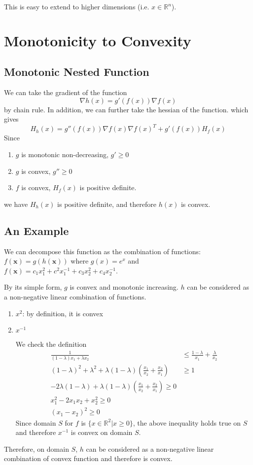 This is easy to extend to higher dimensions (i.e. $x \in \mathbb{R}^n$).

\section{Monotonicity to Convexity}

\subsection{Monotonic Nested Function}

We can take the gradient of the function
\[
\nabla h(x) = g'(f(x))\nabla f(x)
\]
by chain rule.
In addition, we can further take the hessian of the function. which gives
\[
H_h(x) = g''(f(x))\nabla f(x) \nabla f(x)^T + g'(f(x))H_f(x)
\]
Since 
\begin{enumerate}
    \item $g$ is monotonic non-decreasing, $g'\geq 0$
    \item $g$ is convex, $g''\geq 0$
    \item $f$ is convex, $H_f(x)$ is positive definite.
\end{enumerate}
we have $H_h(x)$ is positive definite, and therefore $h(x)$ is convex.

\subsection{An Example}
We can decompose this function as the combination of functions: $f(\mathbf{x}) = g(h(\mathbf{x}))$ where $g(x) = e^x$ and $f(\mathbf{x}) = c_1x_1^2+ c^2x_1^{-1} + c_3x_2^2+c_4x_2^{-1}$.

By its simple form, $g$ is convex and monotonic increasing. $h$ can be considered as a non-negative linear combination of functions. 
\begin{enumerate}
    \item $x^2$: by definition, it is convex
    \item $x^{-1}$\par
    We check the definition
    \begin{align*}
    \frac{1}{(1-\lambda)x_1+\lambda x_2} &\leq \frac{1-\lambda}{x_1} + \frac{\lambda}{x_2} \\
    (1-\lambda)^2 + \lambda^2 + \lambda(1 - \lambda) (\frac{x_1}{x_2} + \frac{x_2}{x_1}) &\geq 1\\
    -2\lambda(1 - \lambda) + \lambda(1-\lambda)(\frac{x_1}{x_2} + \frac{x_2}{x_1}) \geq 0\\
    x_1^2 - 2x_1x_2 + x_2^2 \geq 0 \\
    (x_1 - x_2)^2 \geq 0
    \end{align*}
    Since domain $S$ for $f$ is $\{x \in \mathbb{R}^2 | x \geq 0\}$, the above inequality holds true on $S$ and therefore $x^{-1}$ is convex on domain $S$.
\end{enumerate}
Therefore, on domain $S$, $h$ can be considered as a non-negative linear combination of convex function and therefore is convex. 

